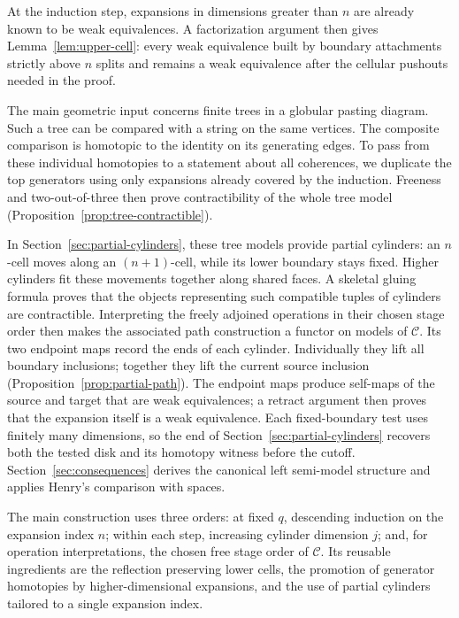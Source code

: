 At the induction step, expansions in dimensions greater than \(n\)
are already known to be weak equivalences.  A factorization argument
then gives Lemma~\ref{lem:upper-cell}: every weak equivalence built by boundary attachments
strictly above \(n\) splits and remains a weak equivalence after the
cellular pushouts needed in the proof.

The main geometric input concerns finite trees in a globular
pasting diagram.  Such a tree can be compared with a string on the same
vertices.  The composite comparison is homotopic to the identity on its
generating edges.  To pass from these individual homotopies
to a statement about all coherences, we duplicate the top generators
using only expansions already covered by the induction.
Freeness and two-out-of-three then prove contractibility of the whole
tree model (Proposition~\ref{prop:tree-contractible}).

In Section~\ref{sec:partial-cylinders}, these tree models provide partial
cylinders: an \(n\)-cell moves along an \((n+1)\)-cell, while its
lower boundary stays fixed.  Higher cylinders fit these movements
together along shared faces.  A skeletal gluing formula proves that
the objects representing such compatible tuples of cylinders are
contractible.  Interpreting the freely adjoined operations in their
chosen stage order then makes the associated path construction a functor on
models of \(\mathcal C\).  Its two endpoint maps record the ends of
each cylinder.  Individually they lift all boundary inclusions; together
they lift the current source inclusion (Proposition~\ref{prop:partial-path}).
The endpoint maps produce self-maps of the source and target that are
weak equivalences; a retract argument then proves that the expansion
itself is a weak equivalence.  Each fixed-boundary
test uses finitely many dimensions, so the end of
Section~\ref{sec:partial-cylinders} recovers
both the tested disk and its homotopy witness before the cutoff.
Section~\ref{sec:consequences} derives the canonical left semi-model
structure and applies Henry's comparison with spaces.

The main construction uses three orders: at fixed \(q\), descending
induction on the expansion index \(n\); within each step, increasing
cylinder dimension \(j\); and, for operation interpretations, the
chosen free stage order of \(\mathcal C\).
Its reusable ingredients are the reflection
preserving lower cells, the promotion of generator homotopies by
higher-dimensional expansions, and the use of partial cylinders tailored
to a single expansion index.
